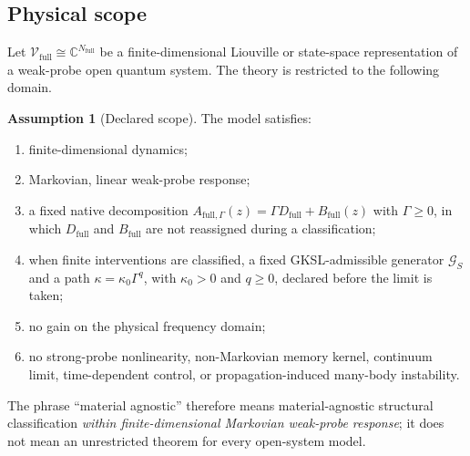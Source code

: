\documentclass[11pt]{article}
\theoremstyle{definition}
\newtheorem{assumption}[theorem]{Assumption}
\theoremstyle{remark}
\theoremstyle{plain}
\newcommand{\V}{\mathcal V}
\newcommand{\C}{\mathbb C}
\newcommand{\full}{\mathrm{full}}
\newcommand{\Gcut}{\mathcal G}
\begin{document}
\subsection{Physical scope}
Let $\V_{\full}\cong\C^{N_{\full}}$ be a finite-dimensional Liouville or state-space representation of a weak-probe open quantum system.  The theory is restricted to the following domain.

\begin{assumption}[Declared scope]\label{ass:scope}
The model satisfies:
\begin{enumerate}[label=(A\arabic*)]
  \item finite-dimensional dynamics;
  \item Markovian, linear weak-probe response;
  \item a fixed native decomposition
  $A_{\full,\Gamma}(z)=\Gamma D_{\full}+B_{\full}(z)$ with
  $\Gamma\ge0$, in which $D_{\full}$ and $B_{\full}$ are not reassigned
  during a classification;
  \item when finite interventions are classified, a fixed
  GKSL-admissible generator $\Gcut_S$ and a path
  $\kappa=\kappa_0\Gamma^q$, with $\kappa_0>0$ and $q\ge0$, declared before
  the limit is taken;
  \item no gain on the physical frequency domain;
  \item no strong-probe nonlinearity, non-Markovian memory kernel, continuum limit, time-dependent control, or propagation-induced many-body instability.
\end{enumerate}
\end{assumption}

The phrase ``material agnostic'' therefore means material-agnostic structural classification \emph{within finite-dimensional Markovian weak-probe response}; it does not mean an unrestricted theorem for every open-system model.
\end{document}

